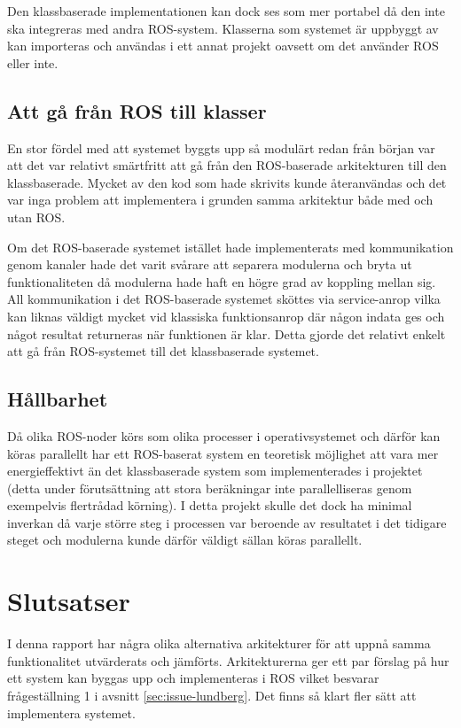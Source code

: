 Den klassbaserade implementationen kan dock ses som mer portabel då den inte ska integreras med andra ROS-system. Klasserna som systemet är uppbyggt av kan importeras och användas i ett annat projekt oavsett om det använder ROS eller inte.

\subsection{Att gå från ROS till klasser}
En stor fördel med att systemet byggts upp så modulärt redan från början var att det var relativt smärtfritt att gå från den ROS-baserade arkitekturen till den klassbaserade. Mycket av den kod som hade skrivits kunde återanvändas och det var inga problem att implementera i grunden samma arkitektur både med och utan ROS.

Om det ROS-baserade systemet istället hade implementerats med kommunikation genom kanaler hade det varit svårare att separera modulerna och bryta ut funktionaliteten då modulerna hade haft en högre grad av koppling mellan sig. All kommunikation i det ROS-baserade systemet sköttes via service-anrop vilka kan liknas väldigt mycket vid klassiska funktionsanrop där någon indata ges och något resultat returneras när funktionen är klar. Detta gjorde det relativt enkelt att gå från ROS-systemet till det klassbaserade systemet.

\subsection{Hållbarhet}
Då olika ROS-noder körs som olika processer i operativsystemet och därför kan köras parallellt har ett ROS-baserat system en teoretisk möjlighet att vara mer energieffektivt än det klassbaserade system som implementerades i projektet (detta under förutsättning att stora beräkningar inte parallelliseras genom exempelvis flertrådad körning). I detta projekt skulle det dock ha minimal inverkan då varje större steg i processen var beroende av resultatet i det tidigare steget och modulerna kunde därför väldigt sällan köras parallellt.


\section{Slutsatser}
\label{sec:conclusions-lundberg}

I denna rapport har några olika alternativa arkitekturer för att uppnå samma funktionalitet utvärderats och jämförts. Arkitekturerna ger ett par förslag på hur ett system kan byggas upp och implementeras i ROS vilket besvarar frågeställning 1 i avsnitt \ref{sec:issue-lundberg}. Det finns så klart fler sätt att implementera systemet.

